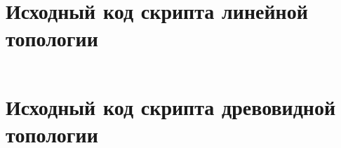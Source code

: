 \documentclass[a4paper, 14pt]{extarticle}
\newenvironment{code}{\captionsetup{type=listing}}{}
\begin{document}
\section{Исходный код скрипта линейной топологии}
\label{app:LinearTopo.py}

\begin{code}
  \inputminted{python}{../code/LinearTopo.py}
\end{code}

\newpage

\section{Исходный код скрипта древовидной топологии}
\label{app:CustomTopo.py}

\begin{code}
  \inputminted{python}{../code/CustomTopo.py}
\end{code}
\end{document}
